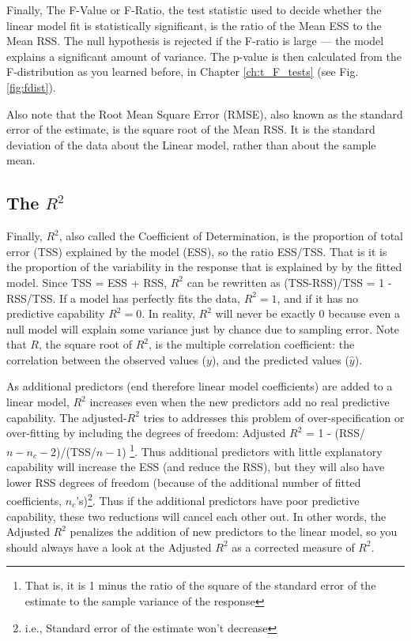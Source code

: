 Finally, The F-Value or F-Ratio, the test statistic used to decide 
whether the linear model fit is statistically significant, is the ratio 
of the Mean ESS to the Mean RSS. The null hypothesis is rejected if the 
F-ratio is large --- the model explains a significant amount of 
variance. The p-value is then calculated from the F-distribution as you 
learned before, in Chapter \ref{ch:t_F_tests} (see Fig. \ref{fig:fdist}).  

Also note that the Root Mean Square Error (RMSE), also known as the 
standard error of the estimate, is the square root of the Mean RSS. It 
is the standard deviation of the data about the Linear model, rather 
than about the sample mean.

\subsection{The $R^{2}$}

Finally, $R^{2}$, also called the Coefficient of Determination, is the 
proportion of total error (TSS) explained by the model (ESS), so the 
ratio ESS/TSS. That is it is the proportion of the variability in the 
response that is explained by  by the fitted model. Since TSS = ESS + 
RSS, $R^{2}$ can be rewritten as (TSS-RSS)/TSS = 1 - RSS/TSS. If a 
model has perfectly fits the data, $R^{2}=1$, and if it has no 
predictive capability $R^{2}=0$. In 
reality, $R^{2}$ will never be exactly 0 because even a null model will 
explain some variance just by chance due to sampling error. Note that 
$R$, the square root of $R^2$, is the multiple correlation coefficient: 
the correlation between the observed values ($y$), and the predicted 
values ($\hat{y}$).

As additional predictors (end therefore linear model coefficients) are 
added to a linear model, $R^2$ increases even when the new predictors 
add no real predictive capability. The adjusted-$R^2$ tries to addresses this 
problem of over-specification or over-fitting by including the degrees 
of freedom: Adjusted $R^2$ = 1 - (RSS/$n-n_c-2$)/(TSS/$n-1$) 
\footnote{That is, it is 1 minus the ratio of the square of the 
standard error of the estimate to the sample variance of the response}. 
Thus additional predictors with little explanatory capability will increase 
the ESS (and reduce the RSS), but they will also have lower RSS degrees of 
freedom (because of the additional number of fitted coefficients, 
$n_c$'s)\footnote{i.e., Standard error of the estimate won't 
decrease}. Thus if the additional predictors have poor predictive 
capability, these two reductions will cancel each other out. In other 
words, the Adjusted $R^2$ penalizes the addition of new predictors to 
the linear model, so you should always have a look at the Adjusted 
$R^2$ as a corrected measure of $R^2$.   

